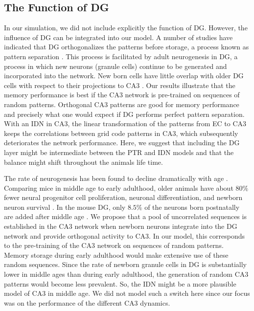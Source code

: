 \documentclass[utf8]{frontiersSCNS} %
\begin{document}
\subsection{The Function of DG}

In our simulation, we did not include explicitly the function of DG. However, the influence of DG can be integrated into our model. A number of studies have indicated that DG orthogonalizes the patterns before storage, a process known as pattern separation \cite{mcnaughton1987hippocampal, o1994hippocampal, marr1991simple, treves2008mammalian}. This process is facilitated by adult neurogenesis in DG, a process in which new neurons (granule cells) continue to be generated and incorporated into the network. New born cells have little overlap with older DG cells with respect to their projections to CA3 \cite{becker2005computational, wiskott2006functional, aimone2009computational}. Our results illustrate that the memory performance is best if the CA3 network is pre-trained on sequences of random patterns. Orthogonal CA3 patterns are good for memory performance and precisely what one would expect if DG performs perfect pattern separation. With an IDN in CA3, the linear transformation of the patterns from EC to CA3 keeps the correlations between grid code patterns in CA3, which subsequently deteriorates the network performance. Here, we suggest that including the DG layer might be intermediate between the PTR and IDN models and that the balance might shift throughout the animals life time. 

The rate of neurogenesis has been found to decline dramatically with age \cite{ kuhn1996neurogenesis, klempin2007adult}. Comparing mice in middle age to early adulthood, older animals have about $80\%$ fewer neural progenitor cell proliferation, neuronal differentiation, and newborn neuron survival \cite{kuipers2015changes}. In the mouse DG, only $8.5\%$ of the neurons born postnatally are added after middle age \cite{lazic2012modeling}. We propose that a pool of uncorrelated sequences is established in the CA3 network when newborn neurons integrate into the DG network and provide orthogonal activity to CA3. In our model, this corresponds to the pre-training of the CA3 network on sequences of random patterns. Memory storage during early adulthood would make extensive use of these random sequences. Since the rate of newborn granule cells in DG is substantially lower in middle ages than during early adulthood, the generation of random CA3 patterns would become less prevalent. So, the IDN might be a more plausible model of CA3 in middle age. We did not model such a switch here since our focus was on the performance of the different CA3 dynamics.
\end{document}
